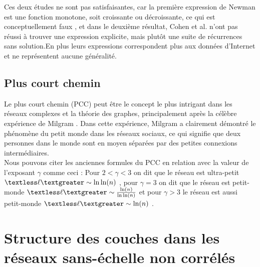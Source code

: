 Ces deux études ne sont pas satisfaisantes, car la première expression de Newman est une fonction monotone, soit croissante ou décroissante, ce qui est conceptuellement faux \cite{Cohen-Havlinl2010}, et dans le deuxième résultat, Cohen et al.  n'ont pas réussi à trouver une expression explicite, mais plutôt une suite de récurrences sans solution.En plus leurs expressions correspondent plus aux données d'Internet et ne représentent aucune généralité.
 
\subsection{Plus court chemin}
\label{PCC}
 Le plus court chemin (PCC) peut être le concept le plus intrigant dans les réseaux complexes et la théorie des graphes, principalement après la célèbre expérience de Milgram \cite{Mi1967}. Dans cette expérience, Milgram a clairement démontré le phénomène du petit monde dans les réseaux sociaux, ce qui signifie que deux personnes dans le monde sont en moyen séparées par des petites connexions intermédiaires.\\
 Nous pouvons citer les anciennes formules du PCC  en relation avec la valeur de l'exposant $\gamma$ comme ceci : Pour $2<\gamma<3$ on dit que le réseau est ultra-petit $\textless\ell\textgreater\sim \ln\ln(n)$ \cite{Cohen-Havlin2003,Do-al2003,Cohen-al2002,Chung-Lu2002,Fox-Bellwood2014,Hofstad-al2014}, pour $\gamma=3$ on dit que le réseau est petit-monde $\textless\ell\textgreater\sim\frac{\ln(n)}{\ln\ln(n)}$ \cite{Bollobas1985,Chung-Lu2002,Fronczak-al2004,Hofstad-al2004,Cohen-Havlin2009} et pour $\gamma>3$ le réseau est aussi petit-monde $\textless\ell\textgreater\sim\ln(n)$ \cite{Bollobas1985,Chung-Lu2002,Fronczak-al2004,Hofstad-al2004,Cohen-Havlin2009}.  

\section{Structure des couches dans les réseaux sans-échelle non corrélés}
